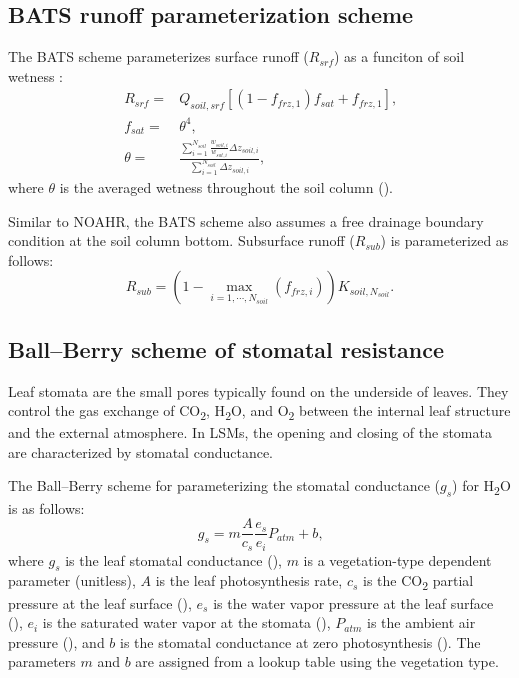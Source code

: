\documentclass[essd, manuscript]{copernicus}
\let\unit\undefined
\begin{document}
\subsection{BATS runoff parameterization scheme}\label{sec:app:noahmp:bats}

The BATS scheme parameterizes surface runoff (\(R_{srf}\)) as a funciton of soil wetness \citep{yang1996GPC}:
\begin{align}
  R_{srf} = & Q_{soil,srf} \left[ (1 - f_{frz,1}) f_{sat} + f_{frz,1} \right]
  \text{,} \\
  f_{sat} = & \theta^4
  \text{,} \\
  \theta =  & \frac{\sum_{i=1}^{N_{soil}}\frac{w_{soil,i}}{w_{sat,i}}\Delta
  z_{soil,i}}
  {\sum_{i=1}^{N_{soil}}\Delta z_{soil,i}}
  \text{,}
\end{align}
where \(\theta\) is the averaged wetness throughout the soil column (\unit{m^3.m^{-3}}).

Similar to NOAHR, the BATS scheme also assumes a free drainage boundary condition at the soil column bottom. Subsurface runoff (\(R_{sub}\)) is parameterized as follows:
\begin{equation}
  R_{sub} = \left(1 - \max_{i=1,\cdots,N_{soil}}(f_{frz,i})\right) K_{soil,N_{soil}}
  \text{.}
\end{equation}

\subsection{Ball--Berry scheme of stomatal resistance}\label{sec:app:noahmp:ballberry}

Leaf stomata are the small pores typically found on the underside of leaves. They control the gas exchange of CO\textsubscript{2}, H\textsubscript{2}O, and O\textsubscript{2} between the internal leaf structure and the external atmosphere. In LSMs, the opening and closing of the stomata are characterized by stomatal conductance.

The Ball--Berry scheme for parameterizing the stomatal conductance (\(g_{s}\)) for H\textsubscript{2}O is as follows:
\begin{equation}
  g_{s}   = m \frac{A}{c_{s}} \frac{e_{s}}{e_{i}} P_{atm} + b
  \text{,}
\end{equation}
where \(g_{s}\) is the leaf stomatal conductance (\unit{\mu mol.m^{-2}.s^{-1}}), \(m\) is a vegetation-type dependent parameter (unitless), \(A\) is the leaf photosynthesis rate, \(c_{s}\) is the CO\textsubscript{2} partial pressure at the leaf surface (\unit{Pa}), \(e_{s}\) is the water vapor pressure at the leaf surface (\unit{Pa}), \(e_{i}\) is the saturated water vapor at the stomata (\unit{Pa}), \(P_{atm}\) is the ambient air pressure (\unit{Pa}), and \(b\) is the stomatal conductance at zero photosynthesis (\unit{\mu mol.m^{-2}.s^{-1}}). The parameters \(m\) and \(b\) are assigned from a lookup table using the vegetation type.
\end{document}
